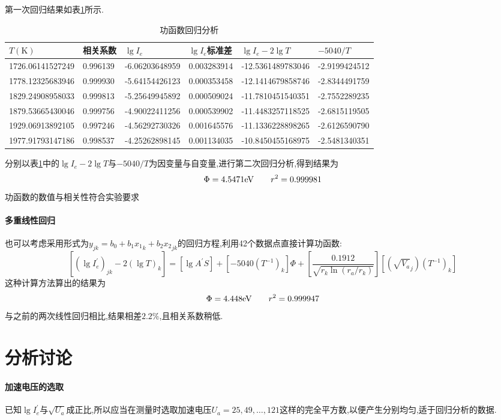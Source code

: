 \documentclass[UTF8,a4paper]{article}%
\begin{document}
第一次回归结果如表\ref{tb:linest}所示.
\begin{table}[H]
    \centering
    \caption{功函数回归分析}
    \begin{tabular}{|l|l|l|l|l|l|}
        \hline
        $T(\unit{\kelvin})$ & 相关系数     & $\lg I_e$         & $\lg I_e$标准差         & $\lg I_e -2\lg T$ & $-5040/T$         \\ \hline
        1726.06141527249    & 0.996139 & -6.06203648959 & 0.003283914 & -12.5361489783046 & -2.9199424512 \\
        1778.12325683946    & 0.999930 & -5.64154426123 & 0.000353458 & -12.1414679858746 & -2.8344491759 \\
        1829.24908958033    & 0.999813 & -5.25649945892 & 0.000509024 & -11.7810451540351 & -2.7552289235 \\
        1879.53665430046    & 0.999756 & -4.90022411256 & 0.000539902 & -11.4483257118525 & -2.6815119505 \\
        1929.06913892105    & 0.997246 & -4.56292730326 & 0.001645576 & -11.1336228898265 & -2.6126590790 \\
        1977.91793147186    & 0.998537 & -4.25262898145 & 0.001134035 & -10.8450455168975 & -2.5481340351 \\ \hline
    \end{tabular}
    \label{tb:linest}
\end{table}
分别以表\ref{tb:linest}中的$\lg I_e -2\lg T$与$-5040/T$为因变量与自变量,进行第二次回归分析,得到结果为
$$\Phi=4.5471\unit{\eV}\qq{}r^2=0.999981$$
功函数的数值与相关性符合实验要求
\paragraph{多重线性回归}
也可以考虑采用形式为$y_{jk}=b_0+b_1{x_1}_{k}+b_2{x_2}_{jk}$的回归方程,利用42个数据点直接计算功函数:
$$\left[(\lg I_e^\prime)_{jk}- 2(\lg T)_k\right]=\left[\lg A^\prime S\right]+\left[ -5040(T^{-1})_k\right]\Phi+\left[ \frac{0.1912}{\sqrt{r_k \ln(r_a/r_k)}}\right]\left[ (\sqrt{V_a}_j)(T^{-1})_k\right]$$
这种计算方法算出的结果为
$$\Phi=4.448\unit{\eV}\qq{}r^2=0.999947$$
与之前的两次线性回归相比,结果相差$2.2\%$,且相关系数稍低.
\section{分析讨论}
\paragraph{加速电压的选取}
已知$\lg I_e^\prime$与$\sqrt{U_a}$成正比,所以应当在测量时选取加速电压$U_a=25,49,\dots,121$这样的完全平方数,以便产生分别均匀,适于回归分析的数据.
\end{document}
